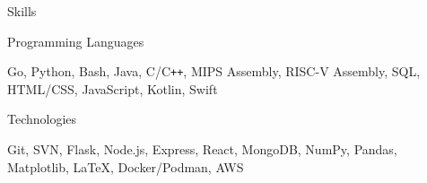 \documentclass{resume}
\begin{document}
\begin{rSection}{\large Skills}

\begin{rSubsection}{Programming Languages}{}{}{}
\item Go, Python, Bash, Java, C/C{}\verb!++!, MIPS Assembly, RISC-V Assembly, SQL, HTML/CSS, JavaScript, Kotlin, Swift 
\end{rSubsection}

\begin{rSubsection}{Technologies}{}{}{}
\item Git, SVN, Flask, Node.js, Express, React, MongoDB, NumPy, Pandas, Matplotlib, LaTeX, Docker/Podman, AWS
\end{rSubsection}
\end{rSection}
\end{document}
